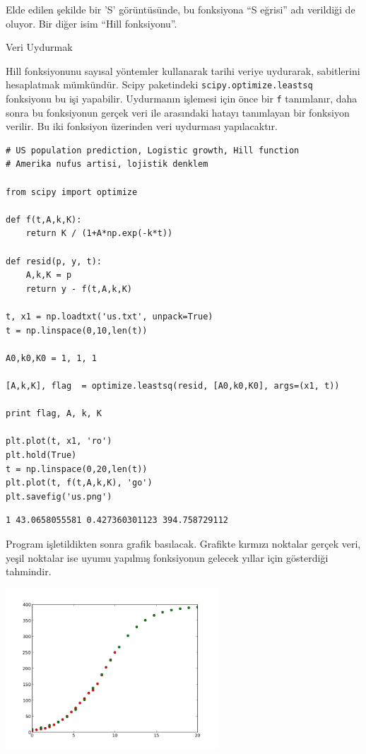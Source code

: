 \documentclass[12pt,fleqn]{article}\usepackage{../../common}
\begin{document}
Elde edilen şekilde bir 'S' görüntüsünde, bu fonksiyona ``S eğrisi'' adı
verildiği de oluyor. Bir diğer isim ``Hill fonksiyonu''. 

Veri Uydurmak 

Hill fonksiyonunu sayısal yöntemler kullanarak tarihi veriye uydurarak,
sabitlerini hesaplatmak mümkündür. Scipy paketindeki
\verb!scipy.optimize.leastsq! fonksiyonu bu işi yapabilir. Uydurmanın
işlemesi için önce bir \verb!f! tanımlanır, daha sonra bu fonksiyonun
gerçek veri ile arasındaki hatayı tanımlayan bir fonksiyon verilir. Bu iki
fonksiyon üzerinden veri uydurması yapılacaktır. 

\begin{verbatim}
# US population prediction, Logistic growth, Hill function
# Amerika nufus artisi, lojistik denklem

from scipy import optimize

def f(t,A,k,K):
    return K / (1+A*np.exp(-k*t))    

def resid(p, y, t):
    A,k,K = p
    return y - f(t,A,k,K)

t, x1 = np.loadtxt('us.txt', unpack=True)
t = np.linspace(0,10,len(t))

A0,k0,K0 = 1, 1, 1

[A,k,K], flag  = optimize.leastsq(resid, [A0,k0,K0], args=(x1, t))

print flag, A, k, K
    
plt.plot(t, x1, 'ro')
plt.hold(True)            
t = np.linspace(0,20,len(t))    
plt.plot(t, f(t,A,k,K), 'go')    
plt.savefig('us.png')
\end{verbatim}

\begin{verbatim}
1 43.0658055581 0.427360301123 394.758729112
\end{verbatim}

Program işletildikten sonra grafik basılacak. Grafikte kırmızı noktalar
gerçek veri, yeşil noktalar ise uyumu yapılmış fonksiyonun gelecek yıllar
için gösterdiği tahmindir. 

\includegraphics[height=6cm]{us.png}
\end{document}
